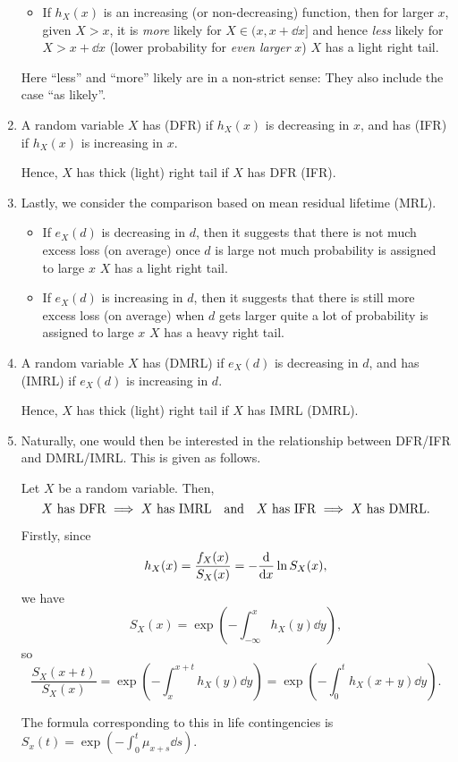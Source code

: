 \begin{enumerate}
\begin{itemize}
\item If \(h_X(x)\) is an increasing (or non-decreasing) function, then for
larger \(x\), given \(X>x\), it is \emph{more} likely for \(X\in(x,x+\dd{x}]\)
and hence \emph{less} likely for \(X>x+\dd{x}\) (lower probability for
\emph{even larger} \(x\))  \(X\) has a light right tail.
\end{itemize}
\begin{note}
Here ``less'' and ``more'' likely are in a non-strict sense: They also include
the case ``as likely''.
\end{note}
\item A random variable \(X\) has  (DFR) if
\(h_X(x)\) is decreasing in \(x\), and has  (IFR)
if \(h_X(x)\) is increasing in \(x\).

Hence, \(X\) has thick (light) right tail if \(X\) has DFR (IFR).

\item Lastly, we consider the comparison based on mean residual lifetime (MRL).
\begin{itemize}
\item If \(e_X(d)\) is decreasing in \(d\), then it suggests that there is not
much excess loss (on average) once \(d\) is large  not much
probability is assigned to large \(x\)  \(X\) has a light
right tail.

\item If \(e_X(d)\) is increasing in \(d\), then it suggests that there is
still more excess loss (on average) when \(d\) gets larger 
quite a lot of probability is assigned to large \(x\) 
\(X\) has a heavy right tail.
\end{itemize}

\item A random variable \(X\) has  (DMRL) if
\(e_X(d)\) is decreasing in \(d\), and has  (IMRL) if \(e_X(d)\) is increasing in \(d\).

Hence, \(X\) has thick (light) right tail if \(X\) has IMRL (DMRL).

\item Naturally, one would then be interested in the relationship between
DFR/IFR and DMRL/IMRL. This is given as follows.
\begin{proposition}
\label{prp:fr-imp-inv-mrl}
Let \(X\) be a random variable. Then,
\[
\text{\(X\) has DFR \(\implies\) \(X\) has IMRL}
\qqtext{and}
\text{\(X\) has IFR \(\implies\) \(X\) has DMRL}.
\]
\end{proposition}
\begin{pf}
Firstly, since
\[
h_X(x)=\frac{f_X(x)}{S_X(x)}=-\dv{}{x}\ln S_X(x),
\]
we have
\[
S_X(x)=\exp(-\int_{-\infty}^{x}h_X(y)\dd{y}),
\]
so
\[
\frac{S_X(x+t)}{S_X(x)}=\exp(-\int_{x}^{x+t}h_X(y)\dd{y})
=\exp(-\int_{0}^{t}h_X(x+y)\dd{y}).
\]
\begin{note}
The formula corresponding to this in life contingencies is
\(S_x(t)=\exp(-\int_{0}^{t}\mu_{x+s}\dd{s})\).
\end{note}


\end{pf}
\end{enumerate}
